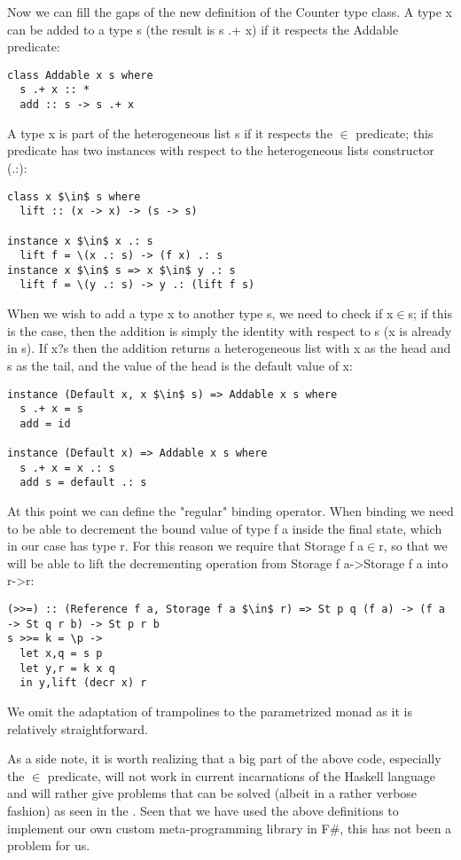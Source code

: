  Now we can fill the gaps of the new definition of the Counter type class. A type x can be added to a type s (the result is s .+ x) if it respects the Addable predicate:

\begin{lstlisting}
class Addable x s where
  s .+ x :: *
  add :: s -> s .+ x
\end{lstlisting}

A type x is part of the heterogeneous list s if it respects the $\in$ predicate; this predicate has two instances with respect to the heterogeneous lists constructor (.:):

\begin{lstlisting}
class x $\in$ s where
  lift :: (x -> x) -> (s -> s)

instance x $\in$ x .: s
  lift f = \(x .: s) -> (f x) .: s
instance x $\in$ s => x $\in$ y .: s
  lift f = \(y .: s) -> y .: (lift f s)
\end{lstlisting}

When we wish to add a type x to another type s, we need to check if x$\in$s; if this is the case, then the addition is simply the identity with respect to s (x is already in s). If x?s then the addition returns a heterogeneous list with x as the head and s as the tail, and the value of the head is the default value of x:

\begin{lstlisting}
instance (Default x, x $\in$ s) => Addable x s where
  s .+ x = s
  add = id

instance (Default x) => Addable x s where
  s .+ x = x .: s
  add s = default .: s
\end{lstlisting}

At this point we can define the "regular" binding operator. When binding we need to be able to decrement the bound value of type f a inside the final state, which in our case has type r. For this reason we require that Storage f a$\in$r, so that we will be able to lift the decrementing operation from Storage f a->Storage f a into r->r:

\begin{lstlisting}
(>>=) :: (Reference f a, Storage f a $\in$ r) => St p q (f a) -> (f a -> St q r b) -> St p r b
s >>= k = \p ->
  let x,q = s p
  let y,r = k x q
  in y,lift (decr x) r
\end{lstlisting}

We omit the adaptation of trampolines to the parametrized monad as it is relatively straightforward.

As a side note, it is worth realizing that a big part of the above code, especially the $\in$ predicate, will not work in current incarnations of the Haskell language and will rather give problems that can be solved (albeit in a rather verbose fashion) as seen in the \cite{4_1}. Seen that we have used the above definitions to implement our own custom meta-programming library in F\#, this has not been a problem for us.
